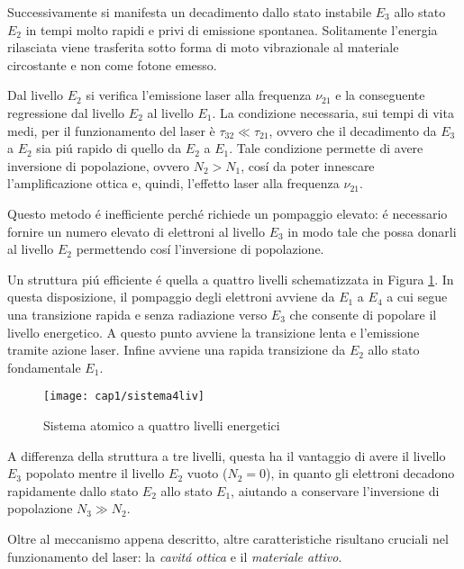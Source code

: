 Successivamente si manifesta un decadimento dallo stato instabile $E_3$ allo stato $E_2$ in tempi molto rapidi e privi di emissione spontanea. Solitamente l'energia rilasciata viene trasferita sotto forma di moto vibrazionale al materiale circostante e non come fotone emesso.

Dal livello $E_2$ si verifica l'emissione laser alla frequenza $\nu_{21}$ e la conseguente regressione dal livello $E_2$ al livello $E_1$. La condizione necessaria, sui tempi di vita medi, per il funzionamento del laser è $\tau_{32} \ll \tau_{21}$, ovvero che il decadimento da $E_3$ a $E_2$ sia pi\'u rapido di quello da $E_2$ a $E_1$. Tale condizione permette di avere inversione di popolazione, ovvero $N_2 > N_1$, cos\'i da poter innescare l'amplificazione ottica e, quindi, l'effetto laser alla frequenza $\nu_{21}$.

Questo metodo \'e inefficiente perch\'e richiede un pompaggio elevato: \'e necessario fornire un numero elevato di elettroni al livello $E_3$ in modo tale che possa donarli al livello $E_2$ permettendo cos\'i l'inversione di popolazione.

Un struttura pi\'u efficiente \'e quella a quattro livelli schematizzata in Figura \ref{sistema4liv}. In questa disposizione, il pompaggio degli elettroni avviene da $E_1$ a $E_4$ a cui segue una transizione rapida e senza radiazione verso $E_3$ che consente di popolare il livello energetico. A questo punto avviene la transizione lenta e l'emissione tramite azione laser. Infine avviene una rapida transizione da $E_2$ allo stato fondamentale $E_1$.

\begin{figure}[H]
	\begin{center}
		\texttt{[image: cap1/sistema4liv]}
		\caption{Sistema atomico a quattro livelli energetici}
		\label{sistema4liv}
	\end{center}
\end{figure}

A differenza della struttura a tre livelli, questa ha il vantaggio di avere il livello $E_3$ popolato mentre il livello $E_2$ vuoto ($N_2=0$), in quanto gli elettroni decadono rapidamente dallo stato $E_2$ allo stato $E_1$, aiutando a conservare l'inversione di popolazione $N_3 \gg N_2$. 
				
Oltre al meccanismo appena descritto, altre caratteristiche risultano cruciali nel funzionamento del laser: la \textit{cavit\'a ottica} e il \textit{materiale attivo}.

